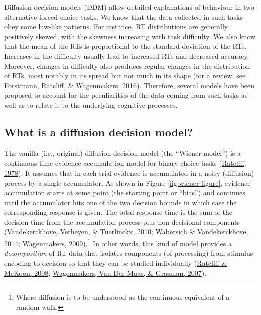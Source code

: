 \documentclass[
  11pt,
  english,
  ,doc,floatsintext]{apa6}
\begin{document}
Diffusion decision models (DDM) allow detailed explanations of behaviour in two-alternative forced choice tasks. We know that the data collected in such tasks obey some law-like patterns. For instance, RT distributions are generally positively skewed, with the skewness increasing with task difficulty. We also know that the mean of the RTs is proportional to the standard deviation of the RTs. Increases in the difficulty usually lead to increased RTs and decreased accuracy. Moreover, changes in difficulty also produces regular changes in the distribution of RTs, most notably in its spread but not much in its shape (for a review, see \protect\hyperlink{ref-forstmann_sequential_2016}{Forstmann, Ratcliff, \& Wagenmakers, 2016}). Therefore, several models have been proposed to account for the peculiarities of the data coming from such tasks as well as to relate it to the underlying cognitive processes.

\hypertarget{what-is-a-diffusion-decision-model}{%
\subsection{What is a diffusion decision model?}\label{what-is-a-diffusion-decision-model}}

The vanilla (i.e., original) diffusion decision model (the ``Wiener model'') is a continuous-time evidence accumulation model for binary choice tasks (\protect\hyperlink{ref-ratcliff_theory_1978}{Ratcliff, 1978}). It assumes that in each trial evidence is accumulated in a noisy (diffusion) process by a single accumulator. As shown in Figure \ref{fig:wiener-figure}, evidence accumulation starts at some point (the starting point or ``bias'') and continues until the accumulator hits one of the two decision bounds in which case the corresponding response is given. The total response time is the sum of the decision time from the accumulation process plus non-decisional components (\protect\hyperlink{ref-vandekerckhove_crossed_2010}{Vandekerckhove, Verheyen, \& Tuerlinckx, 2010}; \protect\hyperlink{ref-wabersich_rwiener_2014}{Wabersich \& Vandekerckhove, 2014}; \protect\hyperlink{ref-wagenmakers_methodological_2009-1}{Wagenmakers, 2009}).\footnote{Where diffusion is to be understood as the continuous equivalent of a random-walk.} In other words, this kind of model provides a \emph{decomposition} of RT data that isolates components (of processing) from stimulus encoding to decision so that they can be studied individually (\protect\hyperlink{ref-ratcliff_diffusion_2008}{Ratcliff \& McKoon, 2008}; \protect\hyperlink{ref-wagenmakers_ez-diffusion_2007}{Wagenmakers, Van Der Maas, \& Grasman, 2007}).
\end{document}
